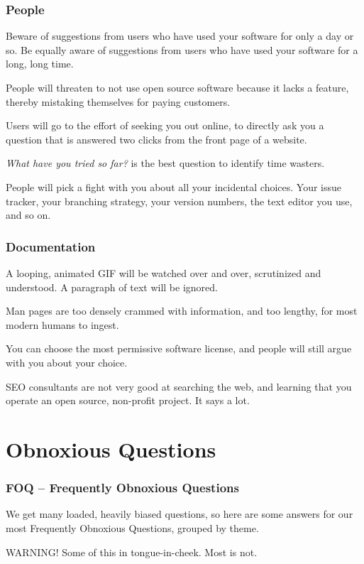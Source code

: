 \documentclass[t,handout]{beamer}
\begin{document}
\begin{frame}[fragile]\frametitle{People}
    Beware of suggestions from users who have used your software for only a day or so. Be equally aware of suggestions from users who have used your software for a long, long time.

    People will threaten to not use open source software because it lacks a feature, thereby mistaking themselves for paying customers.

    Users will go to the effort of seeking you out online, to directly ask you a question that is answered two clicks from the front page of a website.

    \textit{What have you tried so far?} is the best question to identify time wasters.

    People will pick a fight with you about all your incidental choices. Your issue tracker, your branching strategy, your version numbers, the text editor you use, and so on.
\end{frame}

\begin{frame}[fragile]\frametitle{Documentation}
    A looping, animated GIF will be watched over and over, scrutinized and understood. A paragraph of text will be ignored.

    Man pages are too densely crammed with information, and too lengthy, for most modern humans to ingest.

    You can choose the most permissive software license, and people will still argue with you about your choice.

    SEO consultants are not very good at searching the web, and learning that you operate an open source, non-profit project. It says a lot.
\end{frame}

\section{Obnoxious Questions}

\begin{frame}[fragile]\frametitle{FOQ -- Frequently Obnoxious Questions}
    \vfill
    We get many loaded, heavily biased questions, so here are some answers for our most Frequently Obnoxious Questions, grouped by theme.

    \begin{alertblock}{WARNING!}
        Some of this in tongue-in-cheek. Most is not.
    \end{alertblock}
    \vfill
\end{frame}
\end{document}
